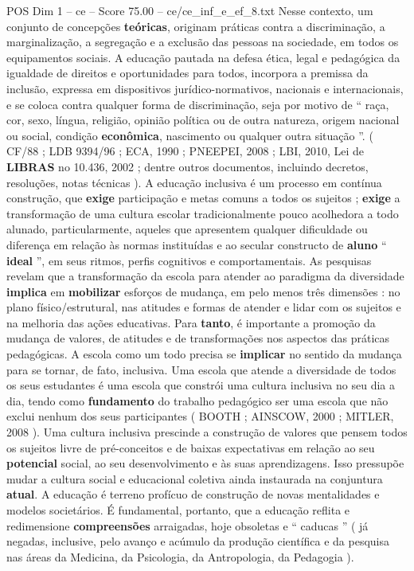 \begin{textsample}{POS Dim 1 – ce – Score 75.00 – ce/ce\_inf\_e\_ef\_8.txt}
Nesse contexto, um conjunto de concepções \textbf{teóricas}, originam práticas contra a discriminação, a marginalização, a segregação e a exclusão das pessoas na sociedade, em todos os equipamentos sociais.
A educação pautada na defesa ética, legal e pedagógica da igualdade de direitos e oportunidades para todos, incorpora a premissa da inclusão, expressa em dispositivos jurídico-normativos, nacionais e internacionais, e se coloca contra qualquer forma de discriminação, seja por motivo de “ raça, cor, sexo, língua, religião, opinião política ou de outra natureza, origem nacional ou social, condição \textbf{econômica}, nascimento ou qualquer outra situação ”. ( CF/88 ; LDB 9394/96 ; ECA, 1990 ; PNEEPEI, 2008 ; LBI, 2010, Lei de \textbf{LIBRAS} no 10.436, 2002 ; dentre outros documentos, incluindo decretos, resoluções, notas técnicas ).
A educação inclusiva é um processo em contínua construção, que \textbf{exige} participação e metas comuns a todos os sujeitos ; \textbf{exige} a transformação de uma cultura escolar tradicionalmente pouco acolhedora a todo alunado, particularmente, aqueles que apresentem qualquer dificuldade ou diferença em relação às normas instituídas e ao secular constructo de \textbf{aluno} “ \textbf{ideal} ”, em seus ritmos, perfis cognitivos e comportamentais.
As pesquisas revelam que a transformação da escola para atender ao paradigma da diversidade \textbf{implica} em \textbf{mobilizar} esforços de mudança, em pelo menos três dimensões : no plano físico/estrutural, nas atitudes e formas de atender e lidar com os sujeitos e na melhoria das ações educativas.
Para \textbf{tanto}, é importante a promoção da mudança de valores, de atitudes e de transformações nos aspectos das práticas pedagógicas.
A escola como um todo precisa se \textbf{implicar} no sentido da mudança para se tornar, de fato, inclusiva.
Uma escola que atende a diversidade de todos os seus estudantes é uma escola que constrói uma cultura inclusiva no seu dia a dia, tendo como \textbf{fundamento} do trabalho pedagógico ser uma escola que não exclui nenhum dos seus participantes ( BOOTH ; AINSCOW, 2000 ; MITLER, 2008 ).
Uma cultura inclusiva prescinde a construção de valores que pensem todos os sujeitos livre de pré-conceitos e de baixas expectativas em relação ao seu \textbf{potencial} social, ao seu desenvolvimento e às suas aprendizagens.
Isso pressupõe mudar a cultura social e educacional coletiva ainda instaurada na conjuntura \textbf{atual}.
A educação é terreno profícuo de construção de novas mentalidades e modelos societários.
É fundamental, portanto, que a educação reflita e redimensione \textbf{compreensões} arraigadas, hoje obsoletas e “ caducas ” ( já negadas, inclusive, pelo avanço e acúmulo da produção científica e da pesquisa nas áreas da Medicina, da Psicologia, da Antropologia, da Pedagogia ).

\end{textsample}
